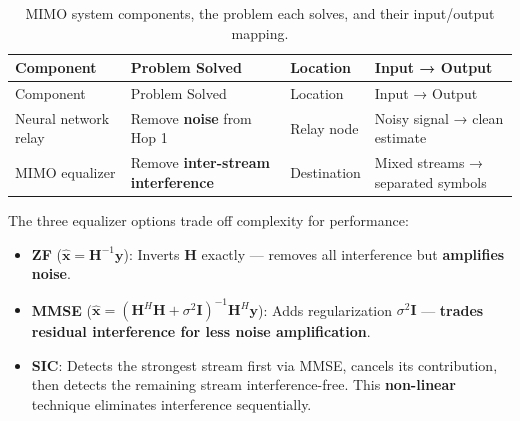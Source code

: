 \begin{longtable}[]{@{}
  >{\raggedright\arraybackslash}p{}
  >{\raggedright\arraybackslash}p{}
  >{\raggedright\arraybackslash}p{}
  >{\raggedright\arraybackslash}p{}@{}}
\caption{MIMO system components, the problem each solves, and their input/output mapping.}\label{tbl:table27}\tabularnewline
\toprule\noalign{}
\begin{minipage}[b]{\linewidth}\raggedright
Component
\end{minipage} & \begin{minipage}[b]{\linewidth}\raggedright
Problem Solved
\end{minipage} & \begin{minipage}[b]{\linewidth}\raggedright
Location
\end{minipage} & \begin{minipage}[b]{\linewidth}\raggedright
Input → Output
\end{minipage} \\
\midrule\noalign{}
\endfirsthead
\toprule\noalign{}
\begin{minipage}[b]{\linewidth}\raggedright
Component
\end{minipage} & \begin{minipage}[b]{\linewidth}\raggedright
Problem Solved
\end{minipage} & \begin{minipage}[b]{\linewidth}\raggedright
Location
\end{minipage} & \begin{minipage}[b]{\linewidth}\raggedright
Input → Output
\end{minipage} \\
\midrule\noalign{}
\endhead
\bottomrule\noalign{}
\endlastfoot
Neural network relay & Remove \textbf{noise} from Hop 1 & Relay node & Noisy signal → clean estimate \\
MIMO equalizer & Remove \textbf{inter-stream interference} & Destination & Mixed streams → separated symbols \\
\end{longtable}

The three equalizer options trade off complexity for performance:

\begin{itemize}
\tightlist
\item
  \textbf{ZF} (\(\hat{\mathbf{x}} = \mathbf{H}^{-1}\mathbf{y}\)): Inverts \(\mathbf{H}\) exactly --- removes all interference but \textbf{amplifies noise}.
\item
  \textbf{MMSE} (\(\hat{\mathbf{x}} = (\mathbf{H}^H\mathbf{H} + \sigma^2\mathbf{I})^{-1}\mathbf{H}^H\mathbf{y}\)): Adds regularization \(\sigma^2\mathbf{I}\) --- \textbf{trades residual interference for less noise amplification}.
\item
  \textbf{SIC}: Detects the strongest stream first via MMSE, cancels its contribution, then detects the remaining stream interference-free. This \textbf{non-linear} technique eliminates interference sequentially.
\end{itemize}

